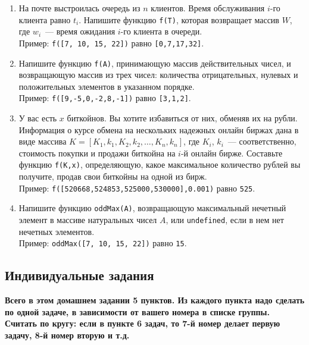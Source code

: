 \documentclass{article}
\begin{document}
\begin{enumerate}[label=0.\theenumi.]
\item 
На почте выстроилась очередь из $n$ клиентов. Время обслуживания $i$-го клиента равно $t_i$. Напишите функцию \texttt{f(T)}, которая возвращает массив $W$, где  $w_i$~--- время ожидания $i$-го клиента в очереди.
\\Пример: \texttt{f([7, 10, 15, 22])} равно \texttt{[0,7,17,32]}.

\item 
Напишите функцию \texttt{f(A)}, принимающую массив действительных чисел, и возвращающую массив из трех чисел: количества отрицательных, нулевых и положительных элементов в указанном порядке. 
\\Пример: \texttt{f([9,-5,0,-2,8,-1])} равно \texttt{[3,1,2]}.

\item 
У вас есть $x$ биткойнов. Вы хотите избавиться от них, обменяв их на рубли. Информация о курсе обмена на нескольких надежных онлайн биржах дана в виде массива $K = [K_1,k_1,K_2,k_2,\ldots,K_n,k_n]$, где $K_i$, $k_i$~--- соответственно, стоимость покупки и продажи биткойна на $i$-й онлайн бирже. Составьте функцию \texttt{f(K,x)}, определяющую, какое максимальное количество рублей вы получите, продав свои биткойны на одной из бирж.
\\Пример: \texttt{f([520668,524853,525000,530000],0.001)} равно \texttt{525}.

\item 
Напишите функцию \texttt{oddMax(A)}, возвращающую максимальный нечетный элемент в массиве натуральных чисел $A$, или \texttt{undefined}, если в нем нет нечетных элементов.
\\Пример: \texttt{oddMax([7, 10, 15, 22])} равно \texttt{15}.
\end{enumerate}



\begin{center}
\subsection*{Индивидуальные задания}
\end{center}

\noindent \textbf{Всего в этом домашнем задании 5 пунктов. Из каждого пункта надо сделать по одной задаче, в зависимости от вашего номера в списке группы. Считать по кругу: если в пункте 6 задач, то 7-й номер делает первую задачу, 8-й номер вторую и т.д.}
\end{document}
